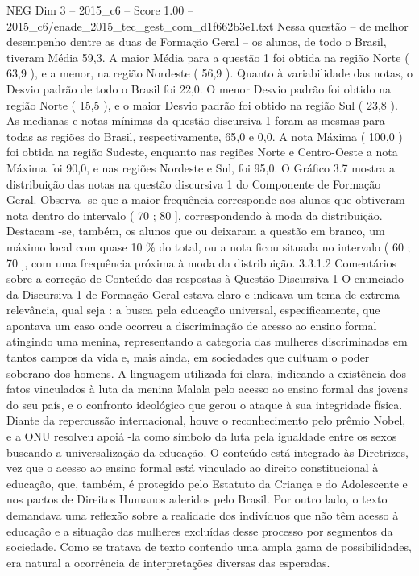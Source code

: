 \begin{textsample}{NEG Dim 3 – 2015\_c6 – Score 1.00 – 2015\_c6/enade\_2015\_tec\_gest\_com\_d1f662b3e1.txt}
Nessa questão – de melhor desempenho dentre as duas de Formação Geral – os alunos, de todo o Brasil, tiveram Média 59,3.
A maior Média para a questão 1 foi obtida na região Norte ( 63,9 ), e a menor, na região Nordeste ( 56,9 ).
Quanto à variabilidade das notas, o Desvio padrão de todo o Brasil foi 22,0.
O menor Desvio padrão foi obtido na região Norte ( 15,5 ), e o maior Desvio padrão foi obtido na região Sul ( 23,8 ).
As medianas e notas mínimas da questão discursiva 1 foram as mesmas para todas as regiões do Brasil, respectivamente, 65,0 e 0,0.
A nota Máxima ( 100,0 ) foi obtida na região Sudeste, enquanto nas regiões Norte e Centro-Oeste a nota Máxima foi 90,0, e nas regiões Nordeste e Sul, foi 95,0.
O Gráfico 3.7 mostra a distribuição das notas na questão discursiva 1 do Componente de Formação Geral.
Observa -se que a maior frequência corresponde aos alunos que obtiveram nota dentro do intervalo ( 70 ; 80 ], correspondendo à moda da distribuição.
Destacam -se, também, os alunos que ou deixaram a questão em branco, um máximo local com quase 10 \% do total, ou a nota ficou situada no intervalo ( 60 ; 70 ], com uma frequência próxima à moda da distribuição. 3.3.1.2 Comentários sobre a correção de Conteúdo das respostas à Questão Discursiva 1 O enunciado da Discursiva 1 de Formação Geral estava claro e indicava um tema de extrema relevância, qual seja : a busca pela educação universal, especificamente, que apontava um caso onde ocorreu a discriminação de acesso ao ensino formal atingindo uma menina, representando a categoria das mulheres discriminadas em tantos campos da vida e, mais ainda, em sociedades que cultuam o poder soberano dos homens.
A linguagem utilizada foi clara, indicando a existência dos fatos vinculados à luta da menina Malala pelo acesso ao ensino formal das jovens do seu país, e o confronto ideológico que gerou o ataque à sua integridade física.
Diante da repercussão internacional, houve o reconhecimento pelo prêmio Nobel, e a ONU resolveu apoiá -la como símbolo da luta pela igualdade entre os sexos buscando a universalização da educação.
O conteúdo está integrado às Diretrizes, vez que o acesso ao ensino formal está vinculado ao direito constitucional à educação, que, também, é protegido pelo Estatuto da Criança e do Adolescente e nos pactos de Direitos Humanos aderidos pelo Brasil.
Por outro lado, o texto demandava uma reflexão sobre a realidade dos indivíduos que não têm acesso à educação e a situação das mulheres excluídas desse processo por segmentos da sociedade.
Como se tratava de texto contendo uma ampla gama de possibilidades, era natural a ocorrência de interpretações diversas das esperadas.

\end{textsample}
